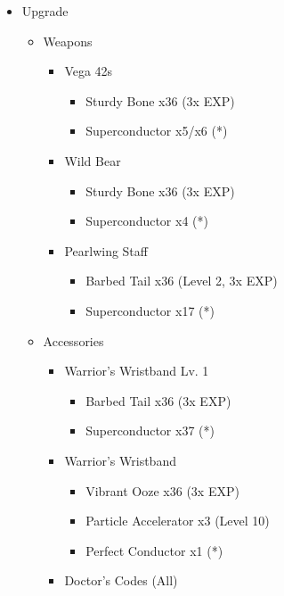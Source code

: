 \documentclass{report}
\begin{document}
\begin{upgrade}
\begin{itemize}
    \item Upgrade
    \begin{itemize}
        \item Weapons
        \begin{itemize}
            \item Vega 42s
            \begin{itemize}
                \item Sturdy Bone x36 (3x EXP)
                \item Superconductor x5/x6 (*)
            \end{itemize}
            \item Wild Bear
            \begin{itemize}
                \item Sturdy Bone x36 (3x EXP)
                \item Superconductor x4 (*)
            \end{itemize}
            \item Pearlwing Staff
            \begin{itemize}
                \item Barbed Tail x36 (Level 2, 3x EXP)
                \item Superconductor x17 (*)
            \end{itemize}
        \end{itemize}
        \item Accessories
        \begin{itemize}
            \item Warrior's Wristband Lv. 1
            \begin{itemize}
                \item Barbed Tail x36 (3x EXP)
                \item Superconductor x37 (*)
            \end{itemize}
            \item Warrior's Wristband
            \begin{itemize}
                \item Vibrant Ooze x36 (3x EXP)
                \item Particle Accelerator x3 (Level 10)
                \item Perfect Conductor x1 (*)
            \end{itemize}
            \item Doctor's Codes (All)

\end{itemize}
\end{itemize}
\end{itemize}
\end{upgrade}
\end{document}

